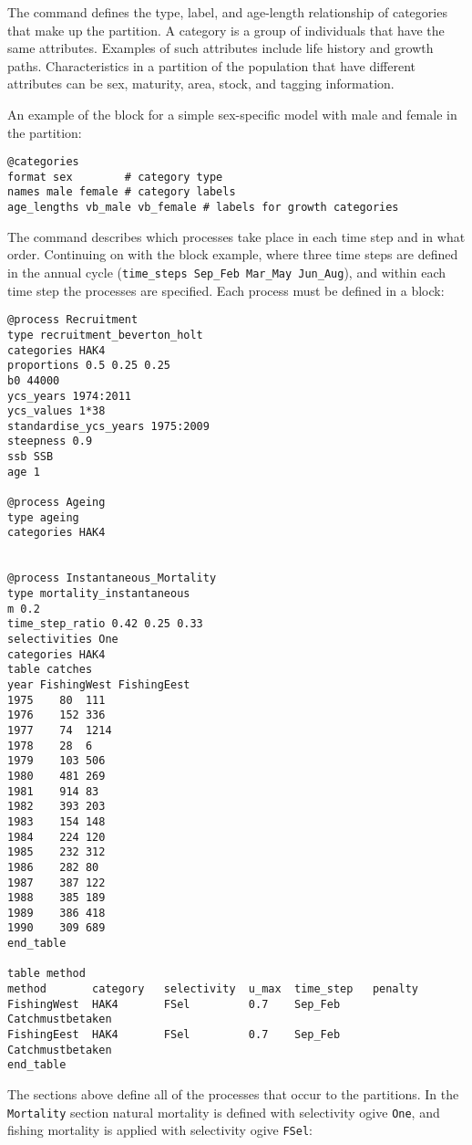 The  command defines the type, label, and age-length relationship of categories that make up the partition. A category is a group of individuals that have the same attributes. Examples of such attributes include life history and growth paths. Characteristics in a partition of the population that have different attributes can be sex, maturity, area, stock, and tagging information.

An example of the  block for a simple sex-specific model with male and female in the partition:

{\small{\begin{verbatim}
@categories
format sex        # category type
names male female # category labels
age_lengths vb_male vb_female # labels for growth categories
		\end{verbatim}}}

The  command describes which processes take place in each time step and in what order. Continuing on with the  block example, where three time steps are defined in the annual cycle (\texttt{time\_steps Sep\_Feb Mar\_May Jun\_Aug}), and within each time step the processes are specified. Each process must be defined in a  block:

{\small{\begin{verbatim}
@process Recruitment
type recruitment_beverton_holt
categories HAK4
proportions 0.5 0.25 0.25
b0 44000
ycs_years 1974:2011
ycs_values 1*38
standardise_ycs_years 1975:2009
steepness 0.9
ssb SSB
age 1

@process Ageing
type ageing
categories HAK4

		
@process Instantaneous_Mortality
type mortality_instantaneous
m 0.2
time_step_ratio 0.42 0.25 0.33
selectivities One
categories HAK4
table catches
year FishingWest FishingEest
1975	80	111
1976	152	336
1977	74	1214
1978	28	6
1979	103	506
1980	481	269
1981	914	83
1982	393	203
1983	154	148
1984	224	120
1985	232	312
1986	282	80
1987	387	122
1988	385	189
1989	386	418
1990	309	689
end_table
		
table method
method  	 category 	selectivity  u_max 	time_step 	penalty
FishingWest  HAK4   	FSel 		 0.7 	Sep_Feb 	Catchmustbetaken
FishingEest  HAK4   	FSel 		 0.7 	Sep_Feb 	Catchmustbetaken
end_table
\end{verbatim}}}

The sections above define all of the processes that occur to the partitions. In the \texttt{Mortality} section natural mortality is defined with selectivity ogive \texttt{One}, and fishing mortality is applied with selectivity ogive \texttt{FSel}:

